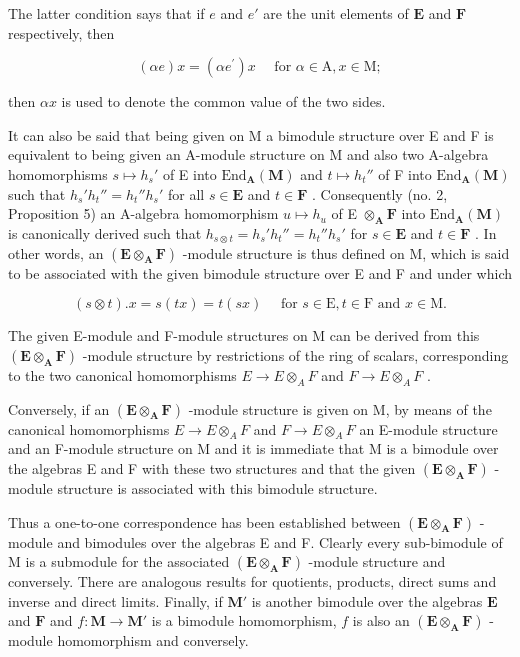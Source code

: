 The latter condition says that if \(e\) and \(e'\) are the unit elements of \(\mathbf{E}\) and \(\mathbf{F}\) respectively, then

\[
(\alpha e) x = (\alpha e ^ {\prime}) x \quad \text { for } \alpha \in \mathrm{A}, x \in \mathrm{M};\tag{8}
\]

then \(\alpha x\) is used to denote the common value of the two sides.

It can also be said that being given on M a bimodule structure over E and F is equivalent to being given an A-module structure on M and also two A-algebra homomorphisms \(s \mapsto h_s'\) of E into \(\mathrm{End}_{\mathbf{A}}(\mathbf{M})\) and \(t \mapsto h_t''\) of F into \(\mathrm{End}_{\mathbf{A}}(\mathbf{M})\) such that \(h_s'h_t'' = h_t''h_s'\) for all \(s \in \mathbf{E}\) and \(t \in \mathbf{F}\) . Consequently (no. 2, Proposition 5) an A-algebra homomorphism \(u \mapsto h_u\) of E \(\otimes_{\mathbf{A}} \mathbf{F}\) into \(\mathrm{End}_{\mathbf{A}}(\mathbf{M})\) is canonically derived such that \(h_{s \otimes t} = h_s'h_t'' = h_t''h_s'\) for \(s \in \mathbf{E}\) and \(t \in \mathbf{F}\) . In other words, an \((\mathbf{E} \otimes_{\mathbf{A}} \mathbf{F})\) -module structure is thus defined on M, which is said to be associated with the given bimodule structure over E and F and under which

\[
(s \otimes t). x = s (t x) = t (s x) \quad \text { for } s \in \mathrm{E}, t \in \mathrm{F} \text { and } x \in \mathrm{M}.
\]

The given E-module and F-module structures on M can be derived from this \((\mathbf{E} \otimes_{\mathbf{A}} \mathbf{F})\) -module structure by restrictions of the ring of scalars, corresponding to the two canonical homomorphisms \(E \to E \otimes_{A} F\) and \(F \to E \otimes_{A} F\) .

Conversely, if an \((\mathbf{E} \otimes_{\mathbf{A}} \mathbf{F})\) -module structure is given on M, by means of the canonical homomorphisms \(E \to E \otimes_{A} F\) and \(F \to E \otimes_{A} F\) an E-module structure and an F-module structure on M and it is immediate that M is a bimodule over the algebras E and F with these two structures and that the given \((\mathbf{E} \otimes_{\mathbf{A}} \mathbf{F})\) -module structure is associated with this bimodule structure.

Thus a one-to-one correspondence has been established between \((\mathbf{E} \otimes_{\mathbf{A}} \mathbf{F})\) -module and bimodules over the algebras E and F. Clearly every sub-bimodule of M is a submodule for the associated \((\mathbf{E} \otimes_{\mathbf{A}} \mathbf{F})\) -module structure and conversely. There are analogous results for quotients, products, direct sums and inverse and direct limits. Finally, if \(\mathbf{M}'\) is another bimodule over the algebras \(\mathbf{E}\) and \(\mathbf{F}\) and \(f\colon \mathbf{M}\to \mathbf{M}'\) is a bimodule homomorphism, \(f\) is also an \((\mathbf{E}\otimes_{\mathbf{A}}\mathbf{F})\) -module homomorphism and conversely.

